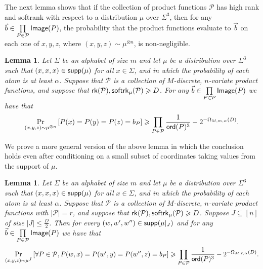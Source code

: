 \documentclass[10pt,a4paper]{amsart}
\newtheorem{lemma}[thm]{Lemma}
\newcommand\Prob[2]{{\Pr_{#1}\left[ {#2} \right]}}
\renewcommand\geq{\geqslant}
\renewcommand\leq{\leqslant}
\begin{document}
    The next lemma shows that if the collection of product functions $\mathcal{P}$ has high rank and softrank with respect to a distribution $\mu$ over $\Sigma^3$, then 
    for any $\vec{b}\in\prod\limits_{P\in\mathcal{P}}{\sf Image}(P)$, the probability that the product functions evaluate to $\vec{b}$ on each one of $x, y, z$, where $(x,y,z)\sim \mu^{\otimes n}$, is non-negligible.
    \begin{lemma}
        Let $\Sigma$ be an alphabet of size $m$ and let $\mu$ be a distribution over $\Sigma^{3}$ such that $(x,x,x)\in {\sf supp}(\mu)$ for all $x\in\Sigma$, and in which the probability of each atom is at least $\alpha$.
        Suppose that $\mathcal{P}$ is a collection of $M$-discrete, $n$-variate product functions, and suppose that ${\sf rk}(\mathcal{P}),{\sf softrk}_{\mu}(\mathcal{P})\geq D$. 
        For any $\vec{b}\in\prod\limits_{P\in\mathcal{P}}{\sf Image}(P)$ we have that
        \[
        \Prob{(x,y,z)\sim\mu^{\otimes n}}{P(x)=P(y)=P(z) = b_P}
        \geq \prod\limits_{P\in\mathcal{P}}\frac{1}{{\sf ord}(P)^3}-2^{-\Omega_{M,m,\alpha}(D)}.
        \]
    \end{lemma}


    We prove a more general version of the above lemma in which the conclusion holds even after conditioning on a small subset of coordinates taking values from the support of $\mu$.

    \begin{lemma}
    \label{lemma:quasirandom_prop_2}
		Let $\Sigma$ be an alphabet of size $m$ and let $\mu$ be a distribution over $\Sigma^{3}$ such that $(x,x,x)\in {\sf supp}(\mu)$ for all $x\in\Sigma$, and in which the probability of each atom is at least $\alpha$.
		Suppose that $\mathcal{P}$ is a collection of $M$-discrete, $n$-variate product functions with $|\mathcal{P}|=r$, and suppose that ${\sf rk}(\mathcal{P}),{\sf softrk}_{\mu}(\mathcal{P})\geq D$. Suppose $J\subseteq [n]$ of size $|J|\leq \frac{D}{2}$. Then for every $(w, w', w'') \in {\sf supp}(\mu|_{J})$ and 
		for any $\vec{b}\in\prod\limits_{P\in\mathcal{P}}{\sf Image}(P)$ we have that
		\[
		\Prob{(x,y,z)\sim\mu^{\bar{J}}}{\forall P\in \mathcal{P}, P(w,x)=P(w', y)=P(w'', z) = b_P}
		\geq \prod\limits_{P\in\mathcal{P}}\frac{1}{{\sf ord}(P)^3}-2^{-\Omega_{M,r,\alpha}(D)}.
		\]
	\end{lemma}
\end{document}
